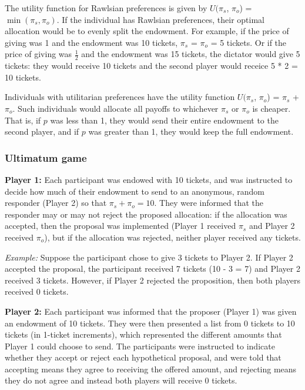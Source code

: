 \documentclass[12pt]{article}
\begin{document}
The utility function for Rawlsian preferences is given by \(U(\pi_{s}\), \(\pi_{o}\)) = \(\min(\pi_{s}, \pi_{o})\). If the individual has Rawlsian preferences, their optimal allocation would be to evenly split the endowment. For example, if the price of giving was 1 and the endowment was 10 tickets, \(\pi_{s}\) = \(\pi_{o}\) = 5 tickets. Or if the price of giving was \(\frac{1}{2}\) and the endowment was 15 tickets, the dictator would give 5 tickets: they would receive 10 tickets and the second player would receice 5 * 2 = 10 tickets. 

Individuals with utilitarian preferences have the utility function \(U(\pi_{s}\), \(\pi_{o}\)) = \(\pi_{s}\) + \(\pi_{o}\). Such individuals would allocate all payoffs to whichever \(\pi_{s}\) or \(\pi_{o}\) is cheaper. That is, if \(p\) was less than 1, they would send their entire endowment to the second player, and if \(p\) was greater than 1, they would keep the full endowment.


\subsubsection{Ultimatum game}

\textbf{Player 1:} Each participant was endowed with 10 tickets, and was instructed to decide how much of their endowment to send to an anonymous, random responder (Player 2) so that \(\pi_{s} + \pi_{o} = 10\). They were informed that the responder may or may not reject the proposed allocation: if the allocation was accepted, then the proposal was implemented (Player 1 received \(\pi_{s}\) and Player 2 received \(\pi_{o}\)), but if the allocation was rejected, neither player received any tickets.

\textit{Example:} Suppose the participant chose to give 3 tickets to Player 2. If Player 2 accepted the proposal, the participant received 7 tickets (10 - 3 = 7) and Player 2 received 3 tickets. However, if Player 2 rejected the proposition, then both players received 0 tickets.
 
\textbf{Player 2:} Each participant was informed that the proposer (Player 1) was given an endowment of 10 tickets. They were then presented a list from 0 tickets to 10 tickets (in 1-ticket increments), which represented the different amounts that Player 1 could choose to send. The participants were instructed to indicate whether they accept or reject each hypothetical proposal, and were told that accepting means they agree to receiving the offered amount, and rejecting means they do not agree and instead both players will receive 0 tickets.
\end{document}
